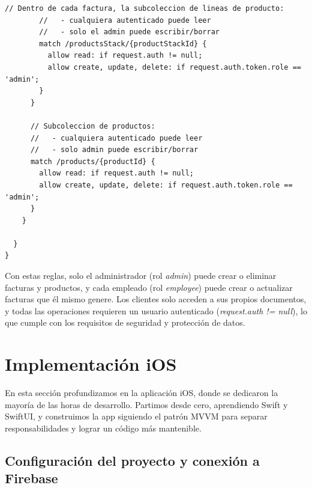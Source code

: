 \begin{large}
\begin{lstlisting}[language={}, caption={Reglas de seguridad de Firestore}]
        // Dentro de cada factura, la subcoleccion de lineas de producto:
        //   - cualquiera autenticado puede leer
        //   - solo el admin puede escribir/borrar
        match /productsStack/{productStackId} {
          allow read: if request.auth != null;
          allow create, update, delete: if request.auth.token.role == 'admin';
        }
      }
      
      // Subcoleccion de productos: 
      //   - cualquiera autenticado puede leer
      //   - solo admin puede escribir/borrar
      match /products/{productId} {
        allow read: if request.auth != null;
        allow create, update, delete: if request.auth.token.role == 'admin';
      }
    }
    
  }
}
\end{lstlisting}

Con estas reglas, solo el administrador (rol \textit{admin}) puede crear o eliminar facturas y productos, y cada empleado (rol \textit{employee}) puede crear o actualizar facturas que él mismo genere. Los clientes solo acceden a sus propios documentos, y todas las operaciones requieren un usuario autenticado (\textit{request.auth != null}), lo que cumple con los requisitos de seguridad y protección de datos.

\end{large}

\section{Implementación iOS}

\begin{large}

En esta sección profundizamos en la aplicación iOS, donde se dedicaron la mayoría de las horas de desarrollo. Partimos desde cero, aprendiendo Swift y SwiftUI, y construimos la app siguiendo el patrón MVVM para separar responsabilidades y lograr un código más mantenible.

\end{large}

\subsection{Configuración del proyecto y conexión a Firebase}

